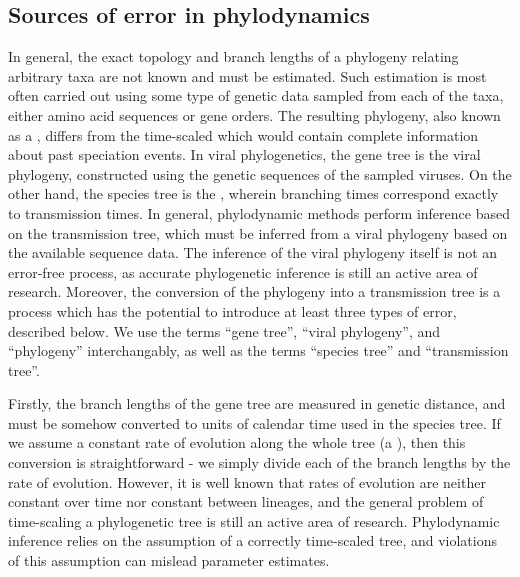 \subsection{Sources of error in phylodynamics}

In general, the exact topology and branch lengths of a phylogeny relating
arbitrary taxa are not known and must be estimated. Such estimation is most
often carried out using some type of genetic data sampled from each of the
taxa, either amino acid sequences or gene orders. The resulting phylogeny, also
known as a , differs from the time-scaled 
which would contain complete information about past speciation events.  In
viral phylogenetics, the gene tree is the viral phylogeny, constructed using
the genetic sequences of the sampled viruses. On the other hand, the species
tree is the , wherein branching times correspond
exactly to transmission times. In general, phylodynamic methods perform
inference based on the transmission tree, which must be inferred from a viral
phylogeny based on the available sequence data. The inference of the viral
phylogeny itself is not an error-free process, as accurate phylogenetic
inference is still an active area of research. Moreover, the conversion of the
phylogeny into a transmission tree is a process which has the potential to
introduce at least three types of error, described below. We use the terms
``gene tree'', ``viral phylogeny'', and ``phylogeny'' interchangably, as well
as the terms ``species tree'' and ``transmission tree''.

Firstly, the branch lengths of the gene tree are measured in genetic distance,
and must be somehow converted to units of calendar time used in the species
tree. If we assume a constant rate of evolution along the whole tree (a
), then this conversion is straightforward - we
simply divide each of the branch lengths by the rate of evolution. However, it
is well known that rates of evolution are neither constant over time nor
constant between lineages, and the general problem of time-scaling a
phylogenetic tree is still an active area of research. Phylodynamic inference
relies on the assumption of a correctly time-scaled tree, and violations of
this assumption can mislead parameter estimates.

